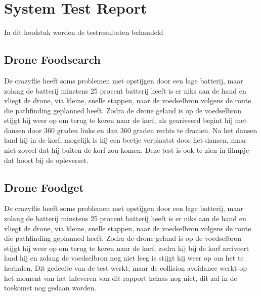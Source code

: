 \section{System Test Report}
In dit hoofstuk worden de testresultaten behandeld

\subsection{Drone Foodsearch}
De crazyflie heeft soms problemen met opstijgen door een lage batterij, maar zolang de batterij minstens 25 procent batterij heeft is er niks aan de hand en vliegt de drone, via kleine, snelle stappen, naar de voedselbron volgens de route die pathfinding geplanned heeft. Zodra de drone geland is op de voedselbron stijgt hij weer op om terug te keren naar de korf, als geariveerd begint hij met dansen door 360 graden links en dan 360 graden rechts te draaien. Na het dansen land hij in de korf, mogelijk is hij een beetje verplaatst door het dansen, maar niet zoveel dat hij buiten de korf zou komen.
Deze test is ook te zien in filmpje dat hoort bij de opleverset.

\subsection{Drone Foodget}
De crazyflie heeft soms problemen met opstijgen door een lage batterij, maar zolang de batterij minstens 25 procent batterij heeft is er niks aan de hand en vliegt de drone, via kleine, snelle stappen, naar de voedselbron volgens de route die pathfinding geplanned heeft. Zodra de drone geland is op de voedselbron stijgt hij weer op om terug te keren naar de korf, zodra hij bij de korf arriveert land hij en zolang de voedselbron nog niet leeg is stijgt hij weer op om het te herhalen.
Dit gedeelte van de test werkt, maar de collision avoidance werkt op het moment van het inleveren van dit rapport helaas nog niet, dit zal in de toekomst nog gedaan worden.